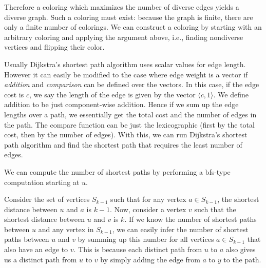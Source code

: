 Therefore a coloring which maximizes the number of diverse edges
yields a diverse graph. Such a coloring must exist: because the
graph is finite, there are only a finite number of colorings.
We can construct a coloring by starting with an arbitrary coloring 
and applying the argument above, i.e., finding nondiverse vertices
and flipping their color.


Usually Dijkstra's shortest path algorithm uses scalar values for edge
length. However it can easily be modified  to the case
where edge weight is a vector if {\em addition} and {\em comparison} can be defined over
the vectors. In this case, if the edge cost  is $c$, we
say the length of the edge is given by the vector  $\langle c, 1\rangle$. We define addition to be
just component-wise addition. Hence if we sum up the edge lengths over a
path, we essentially get the total cost and the number of edges in the
path. The compare function can be just the lexicographic (first by the total cost, then by the number of edges). With this, we can run Dijkstra's shortest path algorithm and find the shortest path that
requires the least number of edges.

\begin{comment}
A key step in Dijkstra's algorithm for single-source shortest paths
involves updating the shortest path estimates as the vertices are discovered.

Instead of storing shortest path length estimates, we can store
a shortest path estimate and the fewest number of edges
for this estimate.  We will record these in two arrays $d[x]$ and $w[x]$.

The process of relaxing the edge $(r,s)$
then updates the shortest path estimate as follows: if $d[r] + d(r,s) < d[s]$, then
$d[s] = d[r] + d(r,s)$ and $w[s] = w[r] + 1$; if  $d[r] + d(r,s) < d[s]$,
nothing  is updated;  and if  $d[r] + d(r,s) = d[s]$ and
$w[s] > w[r] + 1$, $w[s] = w[r] + 1$.

This has the same complexity as Dijkstra's algorithm but keeps track of
the fewest edges on a shortest path.
\end{comment}

We can compute the number of shortest paths by 
performing a bfs-type computation starting at $u$.

Consider the set of vertices $S_{k-1}$ such that for any vertex $a \in S_{k-1}$, the shortest
 distance between $u$ and $a$ is $k-1$. Now, consider a vertex $v$ such that the shortest distance
 between $u$ and $v$ is $k$. If we know the number of shortest paths between $u$ and any vertex in
 $S_{k-1}$, we can easily infer the number of shortest paths between $u$ and $v$ by summing up this
 number for all vertices $a \in S_{k-1}$ that also have an edge to $v$.  This is because each 
 distinct path from $u$ to $a$ also gives us a distinct path from $u$ to $v$ by simply adding the
 edge from $a$ to $y$ to the path. 

